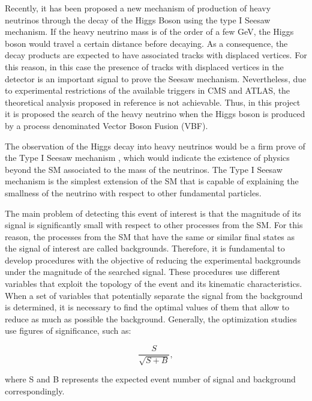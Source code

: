 Recently, it has been proposed a new mechanism of production of heavy neutrinos through the decay of the Higgs Boson \cite{Seesaw Mechanism with displaced vertices} using the type I Seesaw mechanism. If the heavy neutrino mass is of the order of a few GeV, the Higgs boson would travel a certain distance before decaying. As a consequence, the decay products are expected to have associated tracks with displaced vertices. For this reason, in this case the presence of tracks with displaced vertices in the detector is an important signal to prove the Seesaw mechanism. Nevertheless, due to experimental restrictions of the available triggers in CMS and ATLAS, the theoretical analysis proposed in reference \cite{Seesaw Mechanism with displaced vertices} is not achievable. Thus, in this project it is proposed the search of the heavy neutrino when the Higgs boson is produced by a process denominated Vector Boson Fusion (VBF).

The observation of the Higgs decay into heavy neutrinos would be a firm prove of the Type I Seesaw mechanism \cite{Type I Seesaw Mechanism}, which would indicate the existence of physics beyond the SM associated to the mass of the neutrinos. The Type I Seesaw mechanism is the simplest extension of the SM that is capable of explaining the smallness of the neutrino with respect to other fundamental particles. 

The main problem of detecting this event of interest is that the magnitude of its signal is significantly small with respect to other processes from the SM. For this reason, the processes from the SM that have the same or similar final states as the signal of interest are called backgrounds. Therefore, it is fundamental to develop procedures with the objective of reducing the experimental backgrounds under the magnitude of the searched signal. These procedures use different variables that exploit the topology of the event and its kinematic characteristics. When a set of variables that potentially separate the signal from the background is determined, it is necessary to find the optimal values of them that allow to reduce as much as possible the background. Generally, the optimization studies use figures of significance, such as: 

\begin{equation}
    \frac{S}{\sqrt{S+B}},
\end{equation}

where S and B represents the expected event number of signal and background correspondingly.

